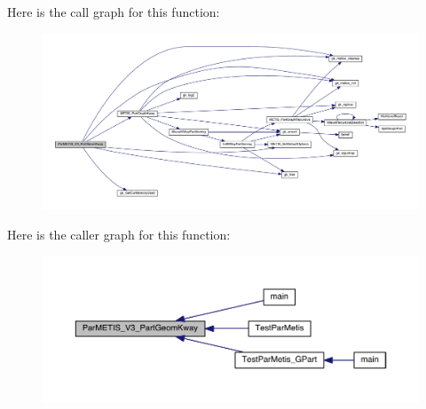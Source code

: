 Here is the call graph for this function\+:\nopagebreak
\begin{figure}[H]
\begin{center}
\leavevmode
\includegraphics[width=350pt]{a00356_a46ac099ac07c553c3eb6641f076ce75f_cgraph}
\end{center}
\end{figure}
Here is the caller graph for this function\+:\nopagebreak
\begin{figure}[H]
\begin{center}
\leavevmode
\includegraphics[width=350pt]{a00356_a46ac099ac07c553c3eb6641f076ce75f_icgraph}
\end{center}
\end{figure}
